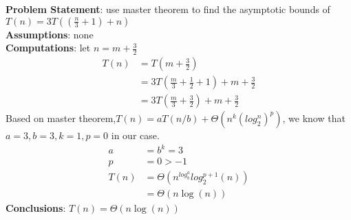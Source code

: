 \documentclass[12pt]{article}
\newenvironment{proposition}[2][Proposition]{\begin{trivlist}
\item[\hskip \labelsep {\bfseries #1}\hskip \labelsep {\bfseries #2.}]}{\end{trivlist}}
\begin{document}
\begin{proposition}{4}
\end{proposition}
\setlength{\parindent}{0pt}
\textbf{Problem Statement}: use master theorem to find the asymptotic bounds of $T(n) = 3T((\frac{n}{3} + 1)+n)$ \\
\textbf{Assumptions}: none\\
\textbf{Computations}: let $n = m + \frac{3}{2}$
\begin{align*}
    T(n) &= T(m+\frac{3}{2}) \\
    &= 3T(\frac{m}{3} + \frac{1}{2} + 1) + m +\frac{3}{2} \\
    & = 3T(\frac{m}{3} + \frac{3}{2}) + m + \frac{3}{2}
\end{align*}
 Based on master theorem,$T(n) = aT(n/b) + \Theta(n^k (log_2^n)^p)$, we know that $a = 3, b = 3, k=1, p=0$ in our case.
 \begin{align*}
     a &= b^k = 3 \\
     p &= 0 > -1 \\
     T(n) &= \Theta(n^{log_b^a}log_2^{p+1}(n)) \\
     &= \Theta(n\log(n))
 \end{align*}
\textbf{Conclusions}: $T(n) = \Theta(n\log(n))$\\ 
\end{document}

